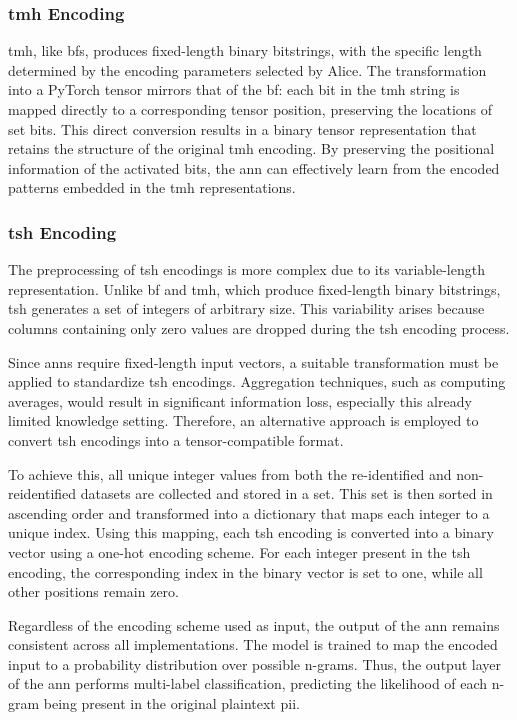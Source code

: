 \subsubsection{\ac{tmh} Encoding}

\ac{tmh}, like \acp{bf}, produces fixed-length binary bitstrings, with the specific length determined by the encoding parameters selected by Alice.
The transformation into a PyTorch tensor mirrors that of the \ac{bf}: each bit in the \ac{tmh} string is mapped directly to a corresponding tensor position, preserving the locations of set bits.
This direct conversion results in a binary tensor representation that retains the structure of the original \ac{tmh} encoding.
By preserving the positional information of the activated bits, the \ac{ann} can effectively learn from the encoded patterns embedded in the \ac{tmh} representations.

\subsubsection{\ac{tsh} Encoding}

The preprocessing of \ac{tsh} encodings is more complex due to its variable-length representation.
Unlike \ac{bf} and \ac{tmh}, which produce fixed-length binary bitstrings, \ac{tsh} generates a set of integers of arbitrary size.
This variability arises because columns containing only zero values are dropped during the \ac{tsh} encoding process.

Since \acp{ann} require fixed-length input vectors, a suitable transformation must be applied to standardize \ac{tsh} encodings.
Aggregation techniques, such as computing averages, would result in significant information loss, especially this already limited knowledge setting.
Therefore, an alternative approach is employed to convert \ac{tsh} encodings into a tensor-compatible format.

To achieve this, all unique integer values from both the re-identified and non-reidentified datasets are collected and stored in a set.
This set is then sorted in ascending order and transformed into a dictionary that maps each integer to a unique index.
Using this mapping, each \ac{tsh} encoding is converted into a binary vector using a one-hot encoding scheme.
For each integer present in the \ac{tsh} encoding, the corresponding index in the binary vector is set to one, while all other positions remain zero.

Regardless of the encoding scheme used as input, the output of the \ac{ann} remains consistent across all implementations.
The model is trained to map the encoded input to a probability distribution over possible n-grams.
Thus, the output layer of the \ac{ann} performs multi-label classification, predicting the likelihood of each n-gram being present in the original plaintext \ac{pii}.

